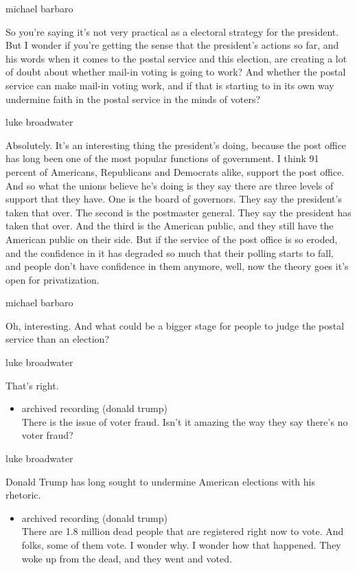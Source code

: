 michael barbaro

So you're saying it's not very practical as a electoral strategy for the
president. But I wonder if you're getting the sense that the president's
actions so far, and his words when it comes to the postal service and
this election, are creating a lot of doubt about whether mail-in voting
is going to work? And whether the postal service can make mail-in voting
work, and if that is starting to in its own way undermine faith in the
postal service in the minds of voters?

luke broadwater

Absolutely. It's an interesting thing the president's doing, because the
post office has long been one of the most popular functions of
government. I think 91 percent of Americans, Republicans and Democrats
alike, support the post office. And so what the unions believe he's
doing is they say there are three levels of support that they have. One
is the board of governors. They say the president's taken that over. The
second is the postmaster general. They say the president has taken that
over. And the third is the American public, and they still have the
American public on their side. But if the service of the post office is
so eroded, and the confidence in it has degraded so much that their
polling starts to fall, and people don't have confidence in them
anymore, well, now the theory goes it's open for privatization.

michael barbaro

Oh, interesting. And what could be a bigger stage for people to judge
the postal service than an election?

luke broadwater

That's right.

\begin{itemize}
\tightlist
\item
  archived recording (donald trump)\\
  There is the issue of voter fraud. Isn't it amazing the way they say
  there's no voter fraud?
\end{itemize}

luke broadwater

Donald Trump has long sought to undermine American elections with his
rhetoric.

\begin{itemize}
\tightlist
\item
  archived recording (donald trump)\\
  There are 1.8 million dead people that are registered right now to
  vote. And folks, some of them vote. I wonder why. I wonder how that
  happened. They woke up from the dead, and they went and voted.
\end{itemize}

